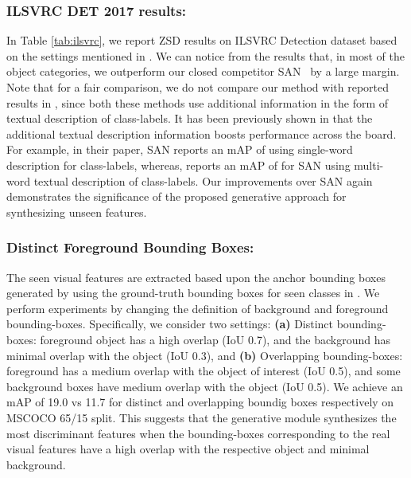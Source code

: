 \documentclass[runningheads]{llncs}
\begin{document}
\subsubsection{ILSVRC DET 2017 results:} In Table \ref{tab:ilsvrc}, we report ZSD results on ILSVRC Detection dataset based on the settings mentioned in \cite{rahman2018zero}. We can notice from the results that, in most of the object categories, we outperform our closed competitor SAN~\cite{rahman2018zero} by a large margin. Note that for a fair comparison, we do not compare our method with reported results in \cite{li2019zero,zhao2020gtnet}, since both these methods use additional information in the form of textual description of class-labels. It has been previously shown in \cite{li2019zero} that the additional textual description information boosts performance across the board. For example, in their paper, SAN \cite{rahman2018zero} reports an mAP of  using single-word description for class-labels, whereas, \cite{li2019zero} reports an mAP of  for SAN using multi-word textual description of class-labels. Our improvements over SAN again demonstrates the significance of the proposed generative approach for synthesizing unseen features.







\subsubsection{Distinct Foreground Bounding Boxes:} The seen visual features are extracted based upon the anchor bounding boxes generated by using the ground-truth bounding boxes for seen classes in . We perform experiments by changing the definition of background and foreground bounding-boxes. Specifically, we consider two settings: \textbf{(a) }Distinct bounding-boxes: foreground object has a high overlap (IoU  0.7), and the background has minimal overlap with the object (IoU  0.3), and  \textbf{(b)} Overlapping bounding-boxes: foreground has a medium overlap with the object of interest (IoU  0.5), and some background boxes have medium overlap with the object (IoU  0.5). We achieve an mAP of 19.0 vs 11.7 for distinct and overlapping boundig boxes respectively  on MSCOCO 65/15 split. This suggests that the generative module synthesizes the most discriminant features when the bounding-boxes corresponding to the real visual features have a high overlap with the respective object and minimal background.   
\end{document}
